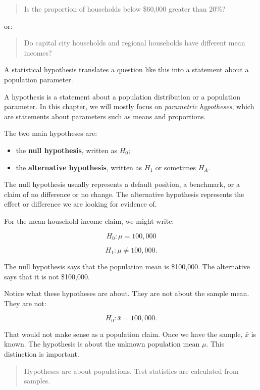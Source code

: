 \documentclass[
  letterpaper,
  DIV=11,
  numbers=noendperiod]{scrreprt}
\providecommand{\tightlist}{%
  \setlength{\itemsep}{0pt}\setlength{\parskip}{0pt}}
\begin{document}
\begin{quote}
Is the proportion of households below \$60,000 greater than 20\%?
\end{quote}

or:

\begin{quote}
Do capital city households and regional households have different mean
incomes?
\end{quote}

A statistical hypothesis translates a question like this into a
statement about a population parameter.

A hypothesis is a statement about a population distribution or a
population parameter. In this chapter, we will mostly focus on
\emph{parametric hypotheses}, which are statements about parameters such
as means and proportions.

The two main hypotheses are:

\begin{itemize}
\tightlist
\item
  the \textbf{null hypothesis}, written as \(H_0\);
\item
  the \textbf{alternative hypothesis}, written as \(H_1\) or sometimes
  \(H_A\).
\end{itemize}

The null hypothesis usually represents a default position, a benchmark,
or a claim of no difference or no change. The alternative hypothesis
represents the effect or difference we are looking for evidence of.

For the mean household income claim, we might write:

\[
H_0: \mu = 100{,}000
\]

\[
H_1: \mu \neq 100{,}000.
\]

The null hypothesis says that the population mean is \$100,000. The
alternative says that it is not \$100,000.

Notice what these hypotheses are about. They are not about the sample
mean. They are not:

\[
H_0: \bar{x} = 100{,}000.
\]

That would not make sense as a population claim. Once we have the
sample, \(\bar{x}\) is known. The hypothesis is about the unknown
population mean \(\mu\). This distinction is important.

\begin{quote}
Hypotheses are about populations. Test statistics are calculated from
samples.
\end{quote}
\end{document}
